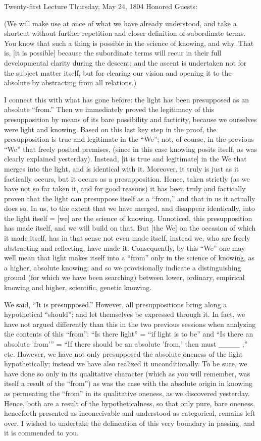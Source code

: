Twenty-first Lecture
Thursday, May 24, 1804
Honored Guests:

(We will make use at once of what we have already understood,
and take a shortcut without further repetition
and closer definition of subordinate terms.
You know that such a thing is possible
in the science of knowing, and why.
That is, [it is possible] because
the subordinate terms will recur
in their full developmental clarity during the descent;
and the ascent is undertaken not for the subject matter itself,
but for clearing our vision
and opening it to the absolute
by abstracting from all relations.)

I connect this with what has gone before:
the light has been presupposed as an absolute “from.”
Then we immediately proved the legitimacy of
this presupposition by means of
its bare possibility and facticity,
because we ourselves were light and knowing.
Based on this last key step in the proof,
the presupposition is true and legitimate in the “We”;
not, of course, in the previous “We” that freely posited premises,
(since in this case knowing posits itself,
as was clearly explained yesterday).
Instead, [it is true and legitimate] in the We
that merges into the light,
and is identical with it.
Moreover, it truly is just as it factically occurs,
but it occurs as a presupposition.
Hence, taken strictly
(as we have not so far taken it, and for good reasons)
it has been truly and factically proven that
the light can presuppose itself as a “from,”
and that in us it actually does so.
In us, to the extent that we have merged,
and disappear identically, into the light itself =
[we] are the science of knowing.
Unnoticed, this presupposition has made itself,
and we will build on that.
But [the We] on the occasion of which it made itself,
has in that sense not even made itself,
instead we, who are freely abstracting and reflecting, have made it.
Consequently, by this “We” one may well mean that
light makes itself into a “from” only
in the science of knowing, as a higher, absolute knowing;
and so we provisionally indicate a distinguishing ground
(for which we have been searching)
between lower, ordinary, empirical knowing
and higher, scientific, genetic knowing.

We said, “It is presupposed.”
However, all presuppositions
bring along a hypothetical “should”;
and let themselves be expressed through it.
In fact, we have not argued differently than this
in the two previous sessions
when analyzing the contents of this “from”:
“Is there light” = “if light is to be”
and “Is there an absolute 'from'” =
“If there should be an absolute 'from,'
then must ____ ,” etc.
However, we have not only presupposed
the absolute oneness of the light hypothetically;
instead we have also realized it unconditionally.
To be sure, we have done so only in its qualitative character
(which as you will remember, was itself a result of the “from”)
as was the case with the absolute origin in knowing
as permeating the “from” in its qualitative oneness,
as we discovered yesterday.
Hence, both are a result of the hypotheticalness,
so that only pure, bare oneness,
henceforth presented as inconceivable
and understood as categorical,
remains left over.
I wished to undertake the delineation of
this very boundary in passing,
and it is commended to you.

